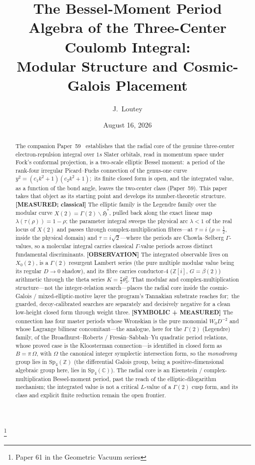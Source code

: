 \documentclass[aps,pra,twocolumn,superscriptaddress,longbibliography]{revtex4-2}
\begin{document}
\title{The Bessel-Moment Period Algebra of the Three-Center Coulomb
Integral:\\
Modular Structure and Cosmic-Galois Placement}
\thanks{Paper 61 in the Geometric Vacuum series}

\author{J.~Loutey}

\date{August 16, 2026}

\begin{abstract}
The companion Paper~59~\cite{loutey_paper59} establishes that the radial core of the genuine
three-center electron-repulsion integral over $1s$ Slater orbitals, read in
momentum space under Fock's conformal projection, is a two-scale elliptic
Bessel moment:\ a period of the rank-four irregular
Picard--Fuchs connection of the genus-one curve
$y^{2}=(c_{1}k^{2}+1)(c_{2}k^{2}+1)$;\ its finite closed form is open, and the
integrated value, as a function of the bond angle, leaves the two-center class
(Paper~59).  This
paper takes that object as its starting point and develops its number-theoretic
structure.  \textbf{[MEASURED; classical]} The elliptic family is the Legendre
family over the modular curve $X(2)=\Gamma(2)\backslash\mathfrak{H}^{\ast}$,
pulled back along the exact linear map $\lambda(\tau(\rho))=1-\rho$; the
parameter integral sweeps the physical arc $\lambda<1$ of the real locus of
$X(2)$ and passes through complex-multiplication fibres---at $\tau=i$ ($\rho=\tfrac12$, inside the
physical domain) and $\tau=i\sqrt2$---where the periods are Chowla--Selberg
$\Gamma$-values, so a molecular integral carries classical $\Gamma$-value
periods across distinct fundamental discriminants.  \textbf{[OBSERVATION]} The
integrated observable lives on $X_{0}(2)$, is a $\Gamma(2)$ resurgent Lambert
series (the pure multiple modular value being its regular $D\to0$ shadow), and
its fibre carries conductor-$4$ ($\mathbb{Z}[i]$, $G=\beta(2)$) arithmetic through the
theta series $K=\tfrac{\pi}{2}\theta_{3}^{2}$. That modular and
complex-multiplication structure---not the integer-relation search---places the
radial core inside the cosmic-Galois / mixed-elliptic-motive layer the program's Tannakian
substrate reaches for;\ the guarded, decoy-calibrated searches are separately
and decisively negative for a clean low-height closed form through weight
three.
\textbf{[SYMBOLIC + MEASURED]} The connection has four master periods whose
Wronskian is the pure monomial $W_{0}D^{-2}$ and whose Lagrange bilinear
concomitant---the analogue, here for the $\Gamma(2)$ (Legendre) family, of the
Broadhurst--Roberts / Fres\'an--Sabbah--Yu quadratic period relations, whose
proved case is the Kloosterman connection---is identified in closed form as
$B=\pi\,\Omega$, with $\Omega$ the canonical integer symplectic intersection
form, so the \emph{monodromy} group lies in $\mathrm{Sp}_{4}(\mathbb{Z})$
(the differential Galois group, being a positive-dimensional algebraic
group here, lies in $\mathrm{Sp}_{4}(\mathbb{C})$).
The radial core is an Eisenstein / complex-multiplication Bessel-moment period,
past the reach of the elliptic-dilogarithm mechanism; the integrated value is not
a critical $L$-value of a $\Gamma(2)$ cusp form, and its class and explicit finite
reduction remain the open frontier.
\end{abstract}
\end{document}

